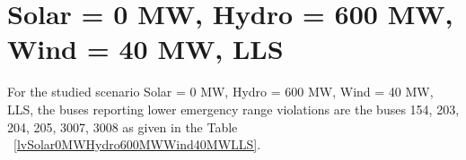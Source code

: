 \documentclass[10pt]{report}
\begin{document}
\section{Solar = 0 MW, Hydro = 600 MW, Wind = 40 MW, LLS}
For the studied scenario Solar = 0 MW, Hydro = 600 MW, Wind = 40 MW, LLS, the buses reporting lower emergency range violations are the buses 154, 203, 204, 205, 3007, 3008 as given in the Table ~\ref{lvSolar0MWHydro600MWWind40MWLLS}.
\begin{table}[H]
\caption{Contingencies reporting bus voltages lower than emergency voltage of 1.1 PU for scenario Solar = 0 MW, Hydro = 600 MW, Wind = 40 MW, LLS}
\label{lvSolar0MWHydro600MWWind40MWLLS}
\centering
{}
\end{table}
\end{document}
